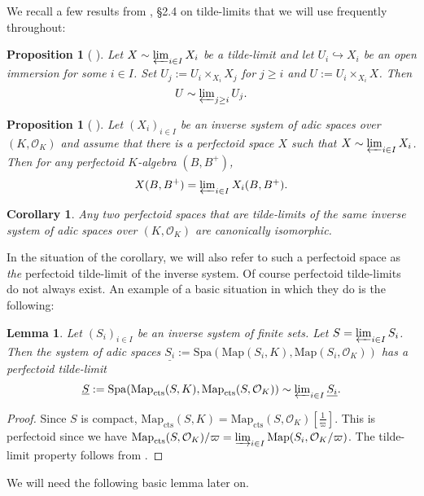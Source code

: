 \documentclass[10pt,oneside]{amsart}
\newtheorem{lemma}[theorem]{Lemma}
\newtheorem{proposition}[theorem]{Proposition}
\newtheorem{corollary}[theorem]{Corollary}
\theoremstyle{definition}
\renewcommand{\O}{\mathcal{O}}
\begin{document}
We recall a few results from \cite{SW}, \S2.4 on tilde-limits that we will use frequently throughout:

\begin{proposition}[{\cite[Proposition 2.4.3]{SW}} ]\label{SW Proposition 2.4.3}
	Let $X\sim \varprojlim_{i\in I} X_i$ be a tilde-limit and let $U_i\hookrightarrow X_i$ be an open immersion for some $i\in I$. Set $U_j:=U_i\times_{X_i}X_j$ for $j\geq i$ and $U:=U_i\times_{X_i}X$. Then 
	\[U\sim \textstyle\varprojlim_{j\geq i} U_j.\]
\end{proposition}

\begin{proposition}[{\cite[Proposition 2.4.5]{SW}} ]\label{SW Proposition 2.4.5}
	Let $(X_i)_{i\in I}$ be an inverse system of adic spaces over $(K,\mathcal O_K)$ and assume that there is a perfectoid space $X$ such that $X\sim \varprojlim_{i\in I} X_i$. Then for any perfectoid $K$-algebra $(B,B^{+})$, 
	\[X(B,B^{+})  = \textstyle\varprojlim_{i\in I}X_i(B,B^{+}).\]
\end{proposition}
\begin{corollary}\label{corollary: perfectoid tilde limit is unique}
	Any two perfectoid spaces that are tilde-limits of the same inverse system of adic spaces over $(K,\mathcal O_K)$ are canonically isomorphic.
\end{corollary}
In the situation of the corollary, we will also refer to such a perfectoid space as \textit{the} perfectoid tilde-limit of the inverse system. Of course perfectoid tilde-limits do not always exist. An example of a basic situation in which they do is the following:
\begin{lemma}\label{l:pro-finite-perfectoid-spaces}
	Let $(S_i)_{i\in I}$ be an inverse system of finite sets. Let $S=\varprojlim_{i\in I} S_i$. Then the system of adic spaces $\underline{S_i}:=\mathrm{Spa}(\mathrm{Map}(S_i,K),\mathrm{Map}(S_i,\O_K))$ has a perfectoid tilde-limit	\[\underline{S}:=\mathrm{Spa}(\mathrm{Map}_{\mathrm{cts}}(S,K),\mathrm{Map}_{\mathrm{cts}}(S,\O_K))\sim\textstyle\varprojlim_{i\in I} \underline{S_i}.\]
\end{lemma}
\begin{proof}
	Since $S$ is compact, $\mathrm{Map}_{\mathrm{cts}}(S,K)=\mathrm{Map}_{\mathrm{cts}}(S,\O_K)[\tfrac{1}{\varpi}]$. This is perfectoid since we have $\mathrm{Map}_{\mathrm{cts}}(S,\O_K)/\varpi=\varinjlim_{i\in I}\mathrm{Map}(S_i,\O_K/\varpi)$. The tilde-limit property follows from \cite[Proposition 2.4.2]{SW}.
\end{proof}
We will need the following basic lemma later on.
\end{document}
